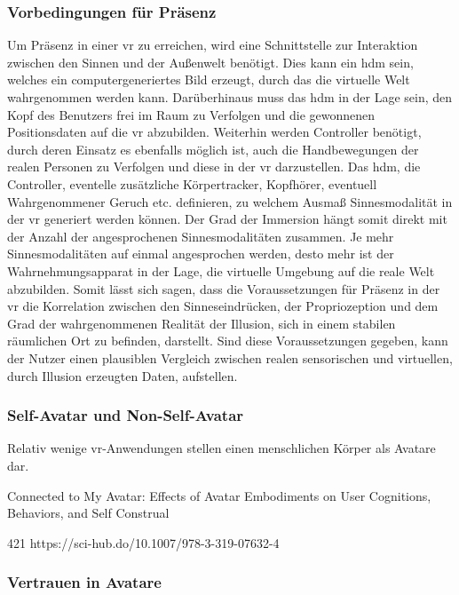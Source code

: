 \documentclass[a4paper,11pt]{article}%
\renewcommand{\\}{\vspace*{0.5\baselineskip} \newline}
\begin{document}
{\subsubsection{Vorbedingungen für Präsenz}
Um Präsenz in einer \ac{vr} zu erreichen, wird eine Schnittstelle zur Interaktion zwischen den Sinnen und der Außenwelt benötigt. Dies kann ein \ac{hdm} sein, welches ein computergeneriertes Bild erzeugt, durch das die virtuelle Welt wahrgenommen werden kann. Darüberhinaus muss das \ac{hdm} in der Lage sein, den Kopf des Benutzers frei im Raum zu Verfolgen und die gewonnenen Positionsdaten auf die \ac{vr} abzubilden. Weiterhin werden Controller benötigt, durch deren Einsatz es ebenfalls möglich ist, auch die Handbewegungen der realen Personen zu Verfolgen und diese in der \ac{vr} darzustellen. Das \ac{hdm}, die Controller, eventelle zusätzliche Körpertracker, Kopfhörer, eventuell Wahrgenommener Geruch etc. definieren, zu welchem Ausmaß Sinnesmodalität in der \ac{vr} generiert werden können. Der Grad der Immersion hängt somit direkt mit der Anzahl der angesprochenen Sinnesmodalitäten zusammen. Je mehr Sinnesmodalitäten auf einmal angesprochen werden, desto mehr ist der Wahrnehmungsapparat in der Lage, die virtuelle Umgebung auf die reale Welt abzubilden. \\
Somit lässt sich sagen, dass die Voraussetzungen für Präsenz in der \ac{vr} die Korrelation zwischen den Sinneseindrücken, der Propriozeption und dem Grad der wahrgenommenen Realität der Illusion, sich in einem stabilen räumlichen Ort zu befinden, darstellt. Sind diese Voraussetzungen gegeben, kann der Nutzer einen plausiblen Vergleich zwischen realen sensorischen und virtuellen, durch Illusion erzeugten Daten, aufstellen. \citep{slater2009we}

\subsubsection{Self-Avatar und Non-Self-Avatar}

Relativ wenige \ac{vr}-Anwendungen stellen einen menschlichen Körper als Avatare dar. 

Connected to My Avatar:
Effects of Avatar Embodiments on User Cognitions, Behaviors,
and Self Construal 

421
https://sci-hub.do/10.1007/978-3-319-07632-4 


\subsubsection{Vertrauen in Avatare}
			
}
\end{document}
